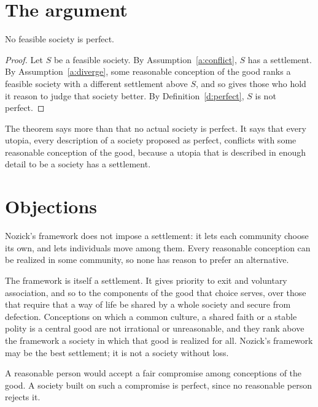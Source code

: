 \documentclass{situationist-preprint}
\begin{document}
\section{The argument}

\begin{theorem}\label{t:main}
No feasible society is perfect.
\end{theorem}

\begin{proof}
Let $S$ be a feasible society. By Assumption~\ref{a:conflict}, $S$ has a settlement. By Assumption~\ref{a:diverge}, some reasonable conception of the good ranks a feasible society with a different settlement above $S$, and so gives those who hold it reason to judge that society better. By Definition~\ref{d:perfect}, $S$ is not perfect.
\end{proof}

The theorem says more than that no actual society is perfect. It says that every utopia, every description of a society proposed as perfect, conflicts with some reasonable conception of the good, because a utopia that is described in enough detail to be a society has a settlement.

\section{Objections}

\begin{objection}
Nozick's framework does not impose a settlement: it lets each community choose its own, and lets individuals move among them. Every reasonable conception can be realized in some community, so none has reason to prefer an alternative.
\end{objection}

\begin{reply}
The framework is itself a settlement. It gives priority to exit and voluntary association, and so to the components of the good that choice serves, over those that require that a way of life be shared by a whole society and secure from defection. Conceptions on which a common culture, a shared faith or a stable polity is a central good are not irrational or unreasonable, and they rank above the framework a society in which that good is realized for all. Nozick's framework may be the best settlement; it is not a society without loss.
\end{reply}


\begin{objection}[Acceptance]
A reasonable person would accept a fair compromise among conceptions of the good. A society built on such a compromise is perfect, since no reasonable person rejects it.
\end{objection}
\end{document}
